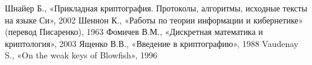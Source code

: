 \begin{thebibliography}{1}
     Шнайер Б., «Прикладная криптография. Протоколы, алгоритмы, исходные тексты на языке Си», 2002
     Шеннон К., «Работы по теории информации и кибернетике» (перевод Писаренко), 1963
     Фомичев В.М., «Дискретная математика и криптология», 2003
     Ященко В.В., «Введение в криптографию», 1988
     Vaudenay S., «On the weak keys of Blowfish», 1996
\end{thebibliography}
